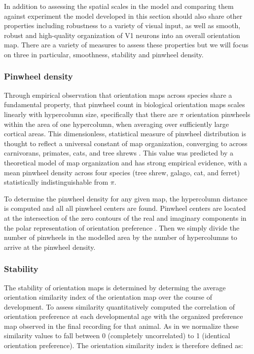In addition to assessing the spatial scales in the model and comparing
them against experiment the model developed in this section should
also share other properties including robustness to a variety of
visual input, as well as smooth, robust and high-quality organization
of V1 neurons into an overall orientation map. There are a variety of
measures to assess these properties but we will focus on three in
particular, smoothness, stability and pinwheel density.

\subsubsection{Pinwheel density}

Through empirical observation that orientation maps across species
share a fundamental property, that pinwheel count in biological
orientation maps scales linearly with hypercolumn size, specifically
that there are $\pi$ orientation pinwheels within the area of one
hypercolumn, when averaging over sufficiently large cortical
areas. This dimensionless, statistical measure of pinwheel
distribution is thought to reflect a universal constant of map
organization, converging to across carnivorans, primates, cats, and
tree shrews \citep{Kaschube2010, Keil2012}. This value was predicted
by a theoretical model of map organization and has strong empirical
evidence, with a mean pinwheel density across four species (tree
shrew, galago, cat, and ferret) statistically indistinguishable from
$\pi$.

To determine the pinwheel density for any given map, the hypercolumn
distance is computed and all all pinwheel centers are found. Pinwheel
centers are located at the intersection of the zero contours of the
real and imaginary components in the polar representation of
orientation preference \citep{Lowel1998}. Then we simply divide the
number of pinwheels in the modelled area by the number of hypercolumns
to arrive at the pinwheel density.

\subsubsection{Stability}

The stability of orientation maps is determined by determing the
average orientation similarity index of the orientation map over the
course of development. To assess similarity quantitatively
\cite{Chapman1996} computed the correlation of orientation preference
at each developmental age with the organized preference map observed
in the final recording for that animal. As in \cite{Stevens2013} we
normalize these similarity values to fall between 0 (completely
uncorrelated) to 1 (identical orientation preference). The orientation
similarity index is therefore defined as:

